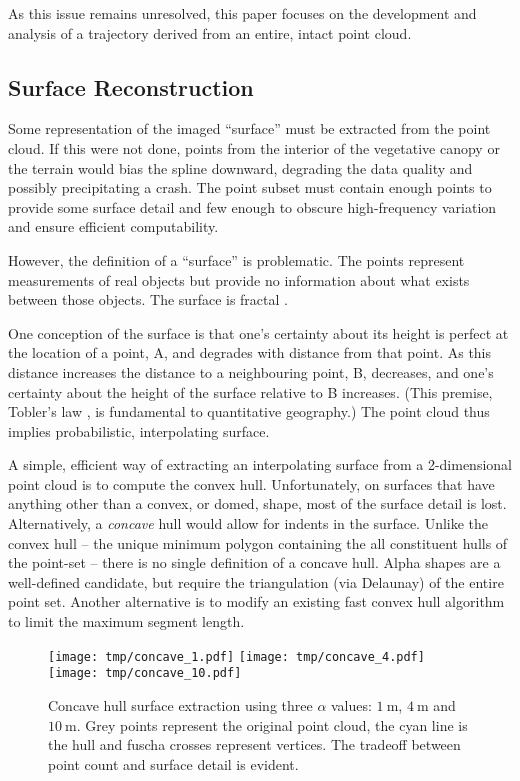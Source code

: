 \documentclass[doc]{apa6}
\begin{document}
As this issue remains unresolved, this paper focuses on the development and analysis of a trajectory derived from an entire, intact point cloud.


\subsection{Surface Reconstruction}

Some representation of the imaged ``surface'' must be extracted from the point cloud. If this were not done, points from the interior of the vegetative canopy or the terrain would bias the spline downward, degrading the data quality and possibly precipitating a crash. The point subset must contain enough points to provide some surface detail and few enough to obscure high-frequency variation and ensure efficient computability. 

However, the definition of a ``surface'' is problematic. The points represent measurements of real objects but provide no information about what exists between those objects. The surface is fractal \parencite{Mandelbrot1967}.

One conception of the surface is that one's  certainty about its height is perfect at the location of a point, A, and degrades with distance from that point. As this distance increases the distance to a neighbouring point, B, decreases, and one's certainty about the height of the surface relative to B increases. (This premise, Tobler's law \parencite{Tobler1970a}, is fundamental to quantitative geography.) The point cloud thus implies probabilistic, interpolating surface. 

A simple, efficient way of extracting an interpolating surface from a 2-dimensional point cloud is to compute the convex hull. Unfortunately, on surfaces that have anything other than a convex, or domed, shape, most of the surface detail is lost. Alternatively, a \emph{concave} hull would allow for indents in the surface. Unlike the convex hull -- the unique minimum polygon containing the all constituent hulls of the point-set -- there is no single definition of a concave hull. Alpha shapes \parencite{Edelsbrunner1994} are a well-defined candidate, but require the triangulation (via Delaunay) of the entire point set. Another alternative is to modify an existing fast convex hull algorithm to limit the maximum segment length.

\begin{figure} %
\texttt{[image: tmp/concave\_1.pdf]} 
\texttt{[image: tmp/concave\_4.pdf]} 
\texttt{[image: tmp/concave\_10.pdf]} 
\caption{Concave hull surface extraction using three $\alpha$ values: $\SI{1}\m$, $\SI{4}\m$ and $\SI{10}\m$. Grey points represent the original point cloud, the cyan line is the hull and fuscha crosses represent vertices. The tradeoff between point count and surface detail is evident.}
\label{fig:concave}
\end{figure}
\end{document}
